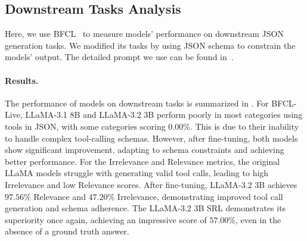\subsection{Downstream Tasks Analysis}
Here, we use BFCL~\citep{berkeley-function-calling-leaderboard} to measure models' performance on downstream JSON generation tasks. We modified its tasks by using JSON schema to constrain the models' output.
The detailed prompt we use can be found in~.

\paragraph{Results.}
The performance of models on downstream tasks is summarized in .
For BFCL-Live, LLaMA-3.1 8B and LLaMA-3.2 3B perform poorly in most categories using tools in JSON, with some categories scoring $0.00\%$. This is due to their inability to handle complex tool-calling schemas. However, after fine-tuning, both models show significant improvement, adapting to schema constraints and achieving better performance.
For the Irrelevance and Relevance metrics, the original LLaMA models struggle with generating valid tool calls, leading to high Irrelevance and low Relevance scores. After fine-tuning, LLaMA-3.2 3B achieves $97.56\%$ Relevance and $47.20\%$ Irrelevance, demonstrating improved tool call generation and schema adherence.
The LLaMA-3.2 3B SRL demonstrates its superiority once again, achieving an impressive score of $57.00\%$, even in the absence of a ground truth answer.


